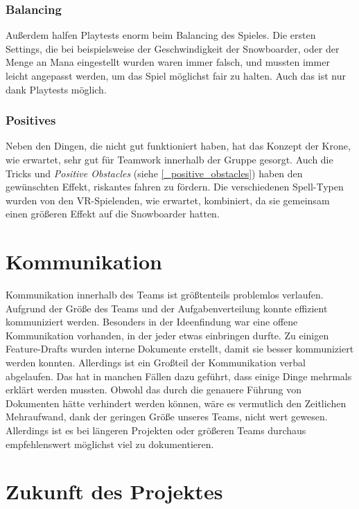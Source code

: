 \subsubsection{Balancing}

Außerdem halfen Playtests enorm beim Balancing des Spieles. Die ersten Settings, die bei beispielsweise der Geschwindigkeit der Snowboarder, oder der Menge an Mana eingestellt wurden waren immer falsch, und mussten immer leicht angepasst werden, um das Spiel möglichst fair zu halten. Auch das ist nur dank Playtests möglich.

\subsubsection{Positives}

Neben den Dingen, die nicht gut funktioniert haben, hat das Konzept der Krone, wie erwartet, sehr gut für Teamwork innerhalb der Gruppe gesorgt. Auch die Tricks und \emph{Positive Obstacles} (siehe \ref{_positive_obstacles}) haben den gewünschten Effekt, riskantes fahren zu fördern. Die verschiedenen Spell-Typen wurden von den VR-Spielenden, wie erwartet, kombiniert, da sie gemeinsam einen größeren Effekt auf die Snowboarder hatten.

\section{Kommunikation}
Kommunikation innerhalb des Teams ist größtenteils problemlos verlaufen. Aufgrund der Größe des Teams und der Aufgabenverteilung konnte effizient kommuniziert werden. Besonders in der Ideenfindung war eine offene Kommunikation vorhanden, in der jeder etwas einbringen durfte. Zu einigen Feature-Drafts wurden interne Dokumente erstellt, damit sie besser kommuniziert werden konnten. Allerdings ist ein Großteil der Kommunikation verbal abgelaufen. Das hat in manchen Fällen dazu geführt, dass einige Dinge mehrmals erklärt werden mussten. Obwohl das durch die genauere Führung von Dokumenten hätte verhindert werden können, wäre es vermutlich den Zeitlichen Mehraufwand, dank der geringen Größe unseres Teams, nicht wert gewesen. Allerdings ist es bei längeren Projekten oder größeren Teams durchaus empfehlenswert möglichst viel zu dokumentieren.

\section{Zukunft des Projektes}

